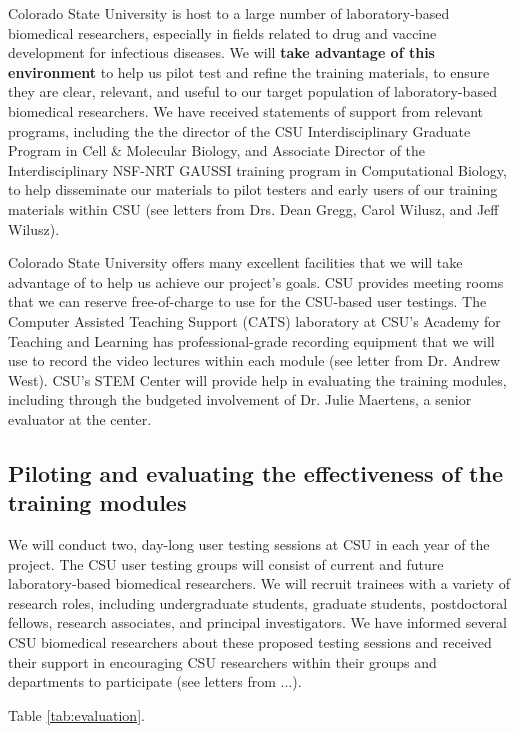 \documentclass[pdftex,english,11pt,parskip=half]{scrartcl}
\begin{document}
Colorado State University is host to a large number of laboratory-based
biomedical researchers, especially in fields related to drug and vaccine
development for infectious diseases. We will \textbf{take advantage of this
environment} to help us pilot test and refine the training materials, to ensure
they are clear, relevant, and useful to our target population of
laboratory-based biomedical researchers. We have received statements of support
from relevant programs, including the the director of the CSU Interdisciplinary
Graduate Program in Cell \& Molecular Biology, and Associate Director of the
Interdisciplinary NSF-NRT GAUSSI training program in Computational Biology, to
help disseminate our materials to pilot testers and early users of our training
materials within CSU (see letters from Drs. Dean Gregg, Carol Wilusz, and Jeff
Wilusz). 

Colorado State University offers many excellent facilities that we will take
advantage of to help us achieve our project's goals. CSU provides meeting rooms
that we can reserve free-of-charge to use for the CSU-based user testings. The
Computer Assisted Teaching Support (CATS) laboratory at CSU's Academy for
Teaching and Learning has professional-grade recording equipment that we will
use to record the video lectures within each module (see letter from Dr. Andrew
West). CSU's STEM Center will provide help in evaluating the training modules,
including through the budgeted involvement of Dr. Julie Maertens, a senior
evaluator at the center. 

\subsection{Piloting and evaluating the effectiveness of the training modules}

We will conduct two, day-long user testing sessions at CSU in each year of the
project. The CSU user testing groups will consist of current and future
laboratory-based biomedical researchers. We will recruit trainees with a variety
of research roles, including undergraduate students, graduate students,
postdoctoral fellows, research associates, and principal investigators. We have
informed several CSU biomedical researchers about these proposed testing
sessions and received their support in encouraging CSU researchers within their
groups and departments to participate (see letters from ...). 

Table \ref{tab:evaluation}.
\end{document}
